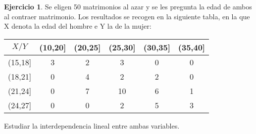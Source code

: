 \documentclass[a4paper, 12pt]{article}
\theoremstyle{definition}
\newtheorem{ej}{Ejercicio}
\begin{document}
\begin{ej}
Se eligen 50 matrimonios al azar y se les pregunta la edad de ambos al contraer matrimonio. Los resultados se recogen en la siguiente tabla, en la que X denota la edad del hombre e Y la de la mujer:
\begin{center}
\begin{tabular}{c|ccccc}
	\(X/Y\) & (10,20] & (20,25] & (25,30] & (30,35] & (35,40] \\
	\hline
	(15,18] & 3 & 2 & 3 & 0 & 0 \\
	(18,21] & 0 & 4 & 2 & 2 & 0 \\
	(21,24] & 0 & 7 & 10 & 6 & 1\\
	(24,27] & 0 & 0 & 2 & 5 & 3\\
\end{tabular}
\end{center}
Estudiar la interdependencia lineal entre ambas variables.

\begin{center}
\end{center}


\end{ej}
\end{document}
